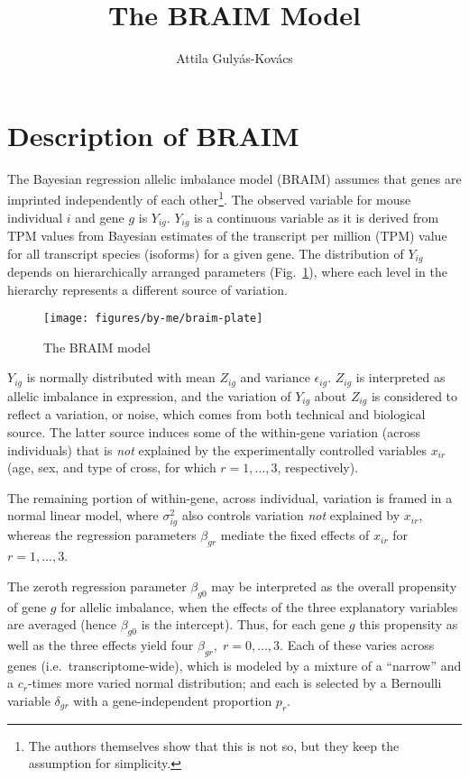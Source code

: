 \documentclass[letterpaper]{article}
\title{The BRAIM Model}
\author{Attila Gulyás-Kovács}
\begin{document}
\maketitle

\section{Description of BRAIM}

The Bayesian regression allelic imbalance model (BRAIM) \cite{Perez2015} assumes that genes are
imprinted independently of each other\footnote{The authors themselves show
that this is not so, but they keep the assumption for simplicity.}.  The
observed variable for mouse individual \(i\) and gene \(g\) is \(Y_{ig}\).
\(Y_{ig}\) is a continuous variable as it is derived from TPM values from
Bayesian estimates of the transcript per million (TPM) value for all
transcript species (isoforms) for a given gene.  The distribution of
\(Y_{ig}\) depends on hierarchically arranged parameters
(Fig.~\ref{fig:braim}), where each level in the hierarchy represents a
different source of variation.

\begin{figure}[t]
\begin{center}
\texttt{[image: figures/by-me/braim-plate]}
\end{center}
\caption{The BRAIM model}
\label{fig:braim}
\end{figure}

\(Y_{ig}\) is normally distributed with mean \(Z_{ig}\) and variance
\(\epsilon_{ig}\).  \(Z_{ig}\) is interpreted as allelic imbalance in
expression, and the variation of \(Y_{ig}\) about \(Z_{ig}\) is considered to
reflect a variation, or noise, which comes from both technical and biological
source.  The latter source induces some of the within-gene variation (across
individuals) that is \emph{not} explained by the experimentally controlled
variables \(x_{ir}\) (age, sex, and type of cross, for which \(r=1,...,3\),
respectively).

The remaining portion of within-gene, across individual, variation is framed
in a normal linear model, where \(\sigma^2_{ig}\) also controls variation
\emph{not} explained by \(x_{ir}\), whereas the regression parameters
\(\beta_{gr}\) mediate the fixed effects of \(x_{ir}\) for \(r=1,...,3\).

The zeroth regression parameter \(\beta_{g0}\) may be interpreted as
the overall propensity of gene \(g\) for allelic imbalance, when the effects
of the three explanatory variables are averaged (hence \(\beta_{g0}\) is the
intercept).  Thus, for each gene \(g\) this propensity as well as
the three effects yield four \(\beta_{gr},\; r=0,...,3\).  Each of these
varies across genes (i.e.~transcriptome-wide), which is modeled by a mixture
of a ``narrow'' and a \(c_r\)-times more varied normal distribution; and each is selected by a
Bernoulli variable \(\delta_{gr}\) with a gene-independent proportion \(p_r\).
\end{document}

